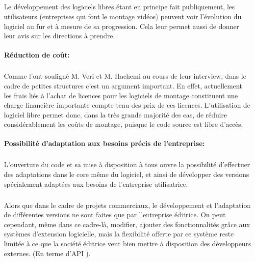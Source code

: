     \subparagraph{ }

    Le développement des logiciels libres étant en principe fait publiquement,
    les utilisateurs (entreprises qui font le montage vidéos) peuvent
    voir l'évolution du logiciel au fur et à mesure de sa progression. Cela leur
    permet aussi de donner leur avis sur les directions à prendre.

  \paragraph{Réduction de coût:}

    \subparagraph{ }

    Comme l'ont souligné  M. Veri et M. Hachemi au cours de leur interview, dans le cadre de petites
    structures c'est un argument important.  En effet,  actuellement les frais liés à l'achat de licences
    pour les logiciels de montage constituent une charge financière importante compte tenu des prix de
    ces licences. L'utilisation de logiciel libre permet donc, dans la très grande majorité des cas, de
    réduire considérablement les coûts de montage, puisque le code source est libre d'accès.

  \paragraph{Possibilité d'adaptation aux besoins précis de l'entreprise:}

    \subparagraph{ }

    L'ouverture du code et sa mise à disposition à tous ouvre la possibilité d'effectuer
    des adaptations dans le core même du logiciel, et ainsi de développer des versions
    spécialement adaptées aux besoins de l'entreprise utilisatrice.

    \subparagraph{ }

    Alors que dans le cadre de projets commerciaux,  le développement et l'adaptation de différentes
    versions ne sont faites que par l'entreprise éditrice. On peut cependant, même dans ce cadre-là,
    modifier, ajouter des fonctionnalités grâce aux systèmes d'extension logicielle, mais la flexibilité
    offerte par ce système reste limitée à ce que la société éditrice veut bien mettre à disposition des développeurs externes. (En terme d'API ).

